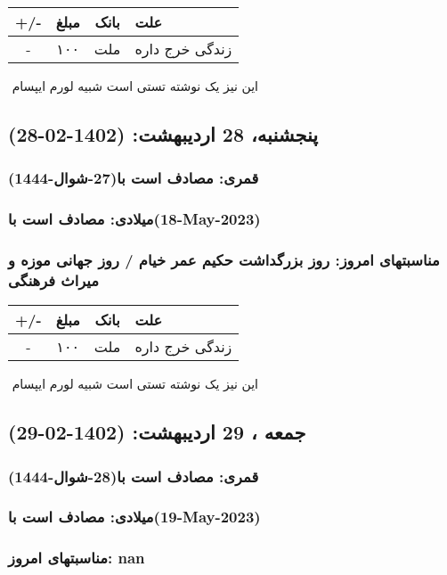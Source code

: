 \documentclass{article}
\newcommand{\rnote}[1]{\marginpar{\textcolor{color}{\StrSubstitute{\##1}{ }{\_}}}}
\newcommand{\myRow}[4]{
    #1 & #2 & #3 & #4 \\ \hline
}
\begin{document}
\begin{tabular}{ | c | c | c | p{5cm} |}
    \hline
    \myRow{ +/- }{مبلغ}{بانک}{علت}
    \myRow{-}{۱۰۰}{ملت}{زندگی خرج داره}
\end{tabular}
\newline
\newline

‌
\rnote{تست}
این نیز یک نوشته تستی است شبیه لورم ایپسام




\newpage
{}
\textcolor{color}{
\section{ پنجشنبه، 28 اردیبهشت: (1402-02-28) }
\subsubsection*{قمری: مصادف است با(27-شوال-1444)} 
\subsubsection*{میلادی: مصادف است با(18-May-2023)}
\subsubsection*{مناسبتهای امروز: روز بزرگداشت حکیم عمر خیام / روز جهانی موزه و میراث فرهنگی}
}


\begin{tabular}{ | c | c | c | p{5cm} |}
    \hline
    \myRow{ +/- }{مبلغ}{بانک}{علت}
    \myRow{-}{۱۰۰}{ملت}{زندگی خرج داره}
\end{tabular}
\newline
\newline

‌
\rnote{تست}
این نیز یک نوشته تستی است شبیه لورم ایپسام




\newpage
{}
\textcolor{color}{
\section{ جمعه ، 29 اردیبهشت: (1402-02-29) }
\subsubsection*{قمری: مصادف است با(28-شوال-1444)} 
\subsubsection*{میلادی: مصادف است با(19-May-2023)}
\subsubsection*{مناسبتهای امروز: nan}
}
\end{document}
